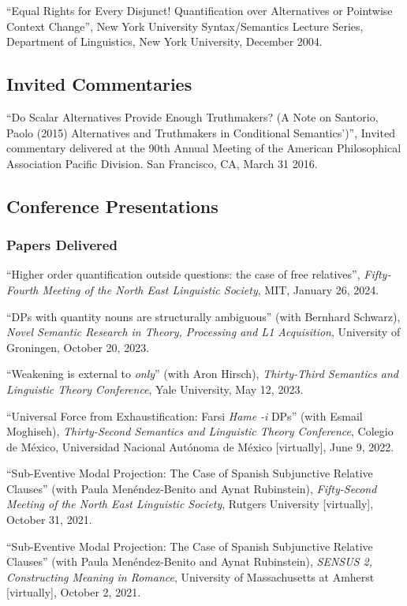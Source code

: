 \documentclass[11pt]{article}
\begin{document}
``Equal Rights for Every Disjunct! Quantification over Alternatives or Pointwise Context Change'', New York University Syntax/Semantics Lecture Series, Department of Linguistics, New York University, December 2004.


\subsection*{Invited Commentaries}

``Do Scalar Alternatives Provide Enough Truthmakers? (A Note on Santorio, Paolo (2015) Alternatives and Truthmakers in Conditional Semantics')'', Invited commentary delivered at the 90th Annual Meeting of the American Philosophical Association Pacific Division. San Francisco, CA, March 31 2016. 


\subsection*{Conference Presentations}


\subsubsection*{Papers Delivered}

``Higher order quantification outside questions: the case of free relatives'', \textit{Fifty-Fourth
  Meeting of the North East Linguistic Society}, MIT, January 26, 2024.

``DPs with quantity nouns are structurally ambiguous'' (with Bernhard Schwarz), \textit{Novel Semantic Research in Theory, Processing and L1 Acquisition}, University of Groningen, October 20, 2023.

``Weakening is external to \textit{only}'' (with Aron Hirsch), \textit{Thirty-Third Semantics and Linguistic Theory Conference}, Yale University, May 12, 2023.

``Universal Force from Exhaustification:
Farsi \textit{Hame} \textit{-i} DPs'' (with Esmail Moghiseh), \textit{Thirty-Second Semantics and Linguistic Theory Conference}, Colegio de M\'exico, Universidad Nacional Aut\'onoma de M\'exico [virtually], June 9, 2022.

``Sub-Eventive Modal Projection:
The Case of Spanish Subjunctive Relative Clauses'' (with Paula Men\'endez-Benito and Aynat Rubinstein), \textit{Fifty-Second Meeting of the North East Linguistic Society}, Rutgers University [virtually], October 31, 2021.


``Sub-Eventive Modal Projection:
The Case of Spanish Subjunctive Relative Clauses'' (with Paula Men\'endez-Benito and Aynat Rubinstein), \textit{SENSUS 2, Constructing Meaning in Romance}, University of Massachusetts at Amherst [virtually], October 2, 2021.
\end{document}
